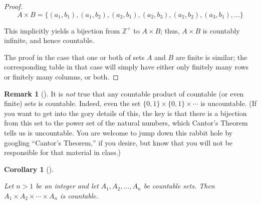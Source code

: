 \documentclass[10pt,]{book}
\theoremstyle{plain}
\newtheorem{corollary}[theorem]{Corollary}
\theoremstyle{definition}
\theoremstyle{definition}
\newtheorem{remark}[theorem]{Remark}
\theoremstyle{definition}
\theoremstyle{definition}
\numberwithin{equation}{section}
\def\Z{\mathbb{Z}}
\begin{document}
\begin{proof}
\begin{equation*}
      A\times B=\{(a_1,b_1),(a_1,b_2),(a_2,b_1),(a_2,b_3),(a_2,b_2),(a_3,b_1),\ldots\}
    
\end{equation*}

\par

    This implicitly yields a bijection from \(\Z^+\) to \(A\times B\); thus, \(A\times B\) is countably infinite, and hence countable.
\par

    The proof in the case that one or both of sets \(A\) and \(B\) are finite is similar; the corresponding table in that case will simply have either only finitely many rows or finitely many columns, or both.
\end{proof}
\begin{remark}[]\label{remark-4}
It is \emph{not} true that any countable product
              of countable (or even finite) sets is countable. Indeed, even
              the set \(\{0,1\}\times \{0,1\}\times \cdots\) is
              uncountable. (If you want to get into the gory details
              of this, the key is that there is a bijection from this set to
              the power set of the natural numbers, which Cantor's Theorem
              tells us is uncountable.  You are welcome to jump down this
              rabbit hole by googling ``Cantor's Theorem,'' if you desire, but
              know that you will not be responsible for that material in
              class.)%
\end{remark}
\begin{corollary}[{}]\label{corollary-1}

        Let \(n>1\) be an integer and let \(A_1,A_2,\ldots, A_n\) be countable sets. Then \(A_1\times A_2\times \cdots \times A_n\) is countable.
\end{corollary}
\typeout{************************************************}
\typeout{************************************************}
\end{document}
